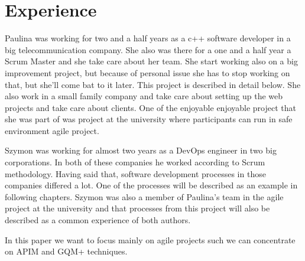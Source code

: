 \section{Experience}

Paulina was working for two and a half years as a c++ software developer in a big telecommunication company. She also was there for a one and a half year a Scrum Master and she take care about her team. She start working also on a big improvement project, but because of personal issue she has to stop working on that, but she'll come bat to it later. This project is described in detail below. She also work in a small family company and take care about setting up the web projects and take care about clients. One of the enjoyable enjoyable project that she was part of was project at the university where participants can run in safe environment agile project. 

Szymon was working for almost two years as a DevOps engineer in two big corporations. In both of these companies he worked according to Scrum methodology. Having said that, software development processes in those companies differed a lot. One of the processes will be described as an example in following chapters. Szymon was also a member of Paulina's team in the agile project at the university and that processes from this project will also be described as a common experience of both authors.

In this paper we want to focus mainly on agile projects such we can concentrate on APIM and GQM+ techniques.
